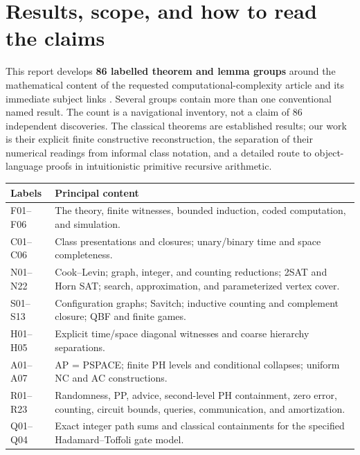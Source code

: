 \section{Results, scope, and how to read the claims}
\label{sec:scope}

This report develops \textbf{86 labelled theorem and lemma groups} around the mathematical content of the requested computational-complexity article and its immediate subject links \cite{WikiRoot}. Several groups contain more than one conventional named result. The count is a navigational inventory, not a claim of 86 independent discoveries. The classical theorems are established results; our work is their explicit finite constructive reconstruction, the separation of their numerical readings from informal class notation, and a detailed route to object-language proofs in intuitionistic primitive recursive arithmetic.

\begin{center}
\begin{tabular}{p{}p{}}
\toprule
Labels & Principal content \\
\midrule
F01--F06 & The theory, finite witnesses, bounded induction, coded computation, and simulation. \\
C01--C06 & Class presentations and closures; unary/binary time and space completeness. \\
N01--N22 & Cook--Levin; graph, integer, and counting reductions; 2SAT and Horn SAT; search, approximation, and parameterized vertex cover. \\
S01--S13 & Configuration graphs; Savitch; inductive counting and complement closure; QBF and finite games. \\
H01--H05 & Explicit time/space diagonal witnesses and coarse hierarchy separations. \\
A01--A07 & AP = PSPACE; finite PH levels and conditional collapses; uniform NC and AC constructions. \\
R01--R23 & Randomness, PP, advice, second-level PH containment, zero error, counting, circuit bounds, queries, communication, and amortization. \\
Q01--Q04 & Exact integer path sums and classical containments for the specified Hadamard--Toffoli gate model. \\
\bottomrule
\end{tabular}
\end{center}

